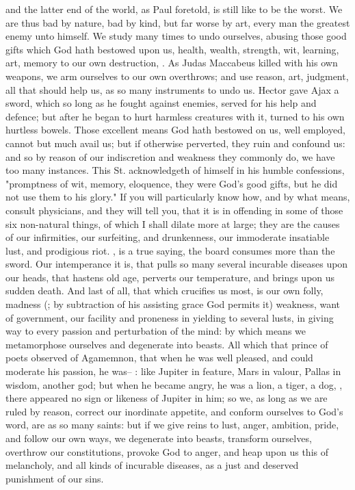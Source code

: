 and the latter end of the world, as Paul foretold, is still
like to be the worst. We are thus bad by nature, bad by kind, but far worse by
art, every man the greatest enemy unto himself. We study many times to undo
ourselves, abusing those good gifts which God hath bestowed upon us, health,
wealth, strength, wit, learning, art, memory to our own destruction,
. As
Judas Maccabeus killed \Apollonius{} with his own weapons, we
arm ourselves to our own overthrows; and use reason, art, judgment, all that
should help us, as so many instruments to undo us. Hector gave Ajax a sword,
which so long as he fought against enemies, served for his help and defence;
but after he began to hurt harmless creatures with it, turned to his own
hurtless bowels. Those excellent means God hath bestowed on us, well employed,
cannot but much avail us; but if otherwise perverted, they ruin and confound
us: and so by reason of our indiscretion and weakness they commonly do, we have
too many instances. This St. \Austin{} acknowledgeth of himself in his humble
confessions, "promptness of wit, memory, eloquence, they were God's good gifts,
but he did not use them to his glory." If you will particularly know how, and
by what means, consult physicians, and they will tell you, that it is in
offending in some of those six non-natural things, of which I shall
dilate more at large; they are the causes of our
infirmities, our surfeiting, and drunkenness, our immoderate insatiable lust,
and prodigious riot. , is a true saying, the
board consumes more than the sword. Our intemperance it is, that pulls so many
several incurable diseases upon our heads, that hastens old
age, perverts our temperature, and brings upon us sudden death. And last of
all, that which crucifies us most, is our own folly, madness (; by subtraction of his assisting grace God permits it)
weakness, want of government, our facility and proneness in yielding to several
lusts, in giving way to every passion and perturbation of the mind: by which
means we metamorphose ourselves and degenerate into beasts. All which that
prince of poets observed of Agamemnon, that when he was
well pleased, and could moderate his passion, he was-- : like Jupiter in feature, Mars in valour, Pallas in wisdom, another god;
but when he became angry, he was a lion, a tiger, a dog, \etc{}, there appeared
no sign or likeness of Jupiter in him; so we, as long as we are ruled by
reason, correct our inordinate appetite, and conform ourselves to God's word,
are as so many saints: but if we give reins to lust, anger, ambition, pride,
and follow our own ways, we degenerate into beasts, transform ourselves,
overthrow our constitutions, provoke God to anger, and heap
upon us this of melancholy, and all kinds of incurable diseases, as a just and
deserved punishment of our sins.

